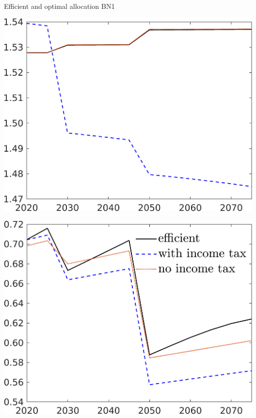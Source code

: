 \documentclass[11pt,aspectratio=169]{beamer}
\begin{document}
\begin{frame}{Efficient and optimal allocation BN1}
\begin{minipage}[]{0.32\textwidth}
	\end{minipage}
	\begin{minipage}[]{0.32\textwidth}
		\includegraphics[width=1\textwidth]{../codding_model/own_basedOnFried/optimalPol_elastS_DisuSci/figures/all_1705/hhhl_CompEffOPT_T_NoTaus_spillover0_sep1_BN1_ineq0_red0_etaa0.79_lgd0.png}
	\end{minipage}
		\begin{minipage}[]{0.32\textwidth}
		\includegraphics[width=1\textwidth]{../codding_model/own_basedOnFried/optimalPol_elastS_DisuSci/figures/all_1705/C_CompEffOPT_T_NoTaus_spillover0_sep1_BN1_ineq0_red1_etaa0.79_lgd1.png}

\end{minipage}
\end{frame}
\end{document}
